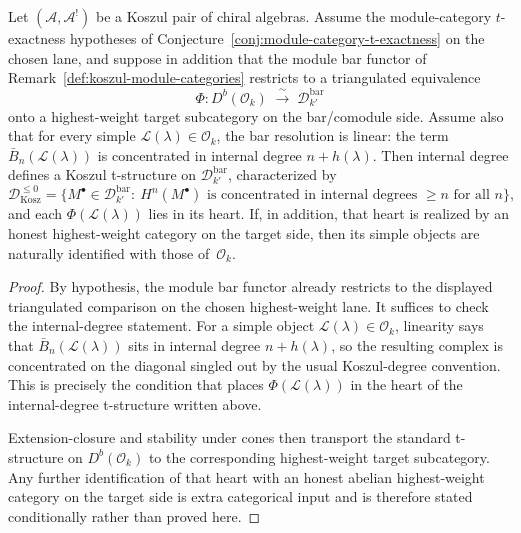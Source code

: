 \begin{proposition}
\label{prop:koszul-t-structures}
\label{conj:koszul-t-structures}
Let $(\mathcal{A}, \mathcal{A}^!)$ be a Koszul pair of chiral
algebras. Assume the module-category $t$-exactness hypotheses of
Conjecture~\ref{conj:module-category-t-exactness} on the chosen lane,
and suppose in addition that the module bar functor of
Remark~\textup{\ref{def:koszul-module-categories}} restricts to a
triangulated equivalence
\begin{equation}\label{eq:derived-koszul}
\Phi\colon D^b(\mathcal{O}_k)
\;\xrightarrow{\;\sim\;}\;
\mathcal{D}_{k'}^{\mathrm{bar}}
\end{equation}
onto a highest-weight target subcategory on the bar/comodule side.
Assume also that for every simple
$\mathcal{L}(\lambda) \in \mathcal{O}_k$, the bar resolution is
linear: the term $\bar{B}_n(\mathcal{L}(\lambda))$ is concentrated in
internal degree $n + h(\lambda)$. Then internal degree defines a
Koszul t-structure on $\mathcal{D}_{k'}^{\mathrm{bar}}$, characterized by
\[
\mathcal{D}^{\leq 0}_{\mathrm{Kosz}}
= \bigl\{M^\bullet \in \mathcal{D}_{k'}^{\mathrm{bar}}
:\ H^n(M^\bullet)\text{ is concentrated in internal degrees }\ge n
\text{ for all }n\bigr\},
\]
and each $\Phi(\mathcal{L}(\lambda))$ lies in its heart. If, in
addition, that heart is realized by an honest highest-weight category
on the target side, then its simple objects are naturally identified
with those of~$\mathcal{O}_k$.
\end{proposition}

\begin{proof}
By hypothesis, the module bar functor already restricts to the
displayed triangulated comparison on the chosen highest-weight lane.
It suffices to check the internal-degree statement. For a simple object
$\mathcal{L}(\lambda) \in \mathcal{O}_k$, linearity says that
$\bar{B}_n(\mathcal{L}(\lambda))$ sits in internal degree
$n + h(\lambda)$, so the resulting complex is concentrated on the
diagonal singled out by the usual Koszul-degree convention. This is
precisely the condition that places $\Phi(\mathcal{L}(\lambda))$ in
the heart of the internal-degree t-structure written above.

Extension-closure and stability under cones then transport the
standard t-structure on $D^b(\mathcal{O}_k)$ to the corresponding
highest-weight target subcategory. Any further identification of that
heart with an honest abelian highest-weight category on the target
side is extra categorical input and is therefore stated conditionally
rather than proved here.
\end{proof}

